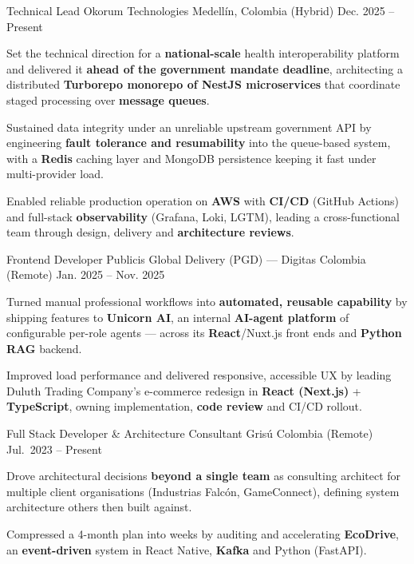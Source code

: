 \newcommand{\quotes}[1]{``#1''}

\begin{cventries}

  \cventry
  {Technical Lead}
  {Okorum Technologies}
  {Medellín, Colombia (Hybrid)}
  {Dec. 2025 -- Present}
  {
    \begin{cvitems}
      \item {Set the technical direction for a \textbf{national-scale} health interoperability platform and delivered it \textbf{ahead of the government mandate deadline}, architecting a distributed \textbf{Turborepo monorepo of NestJS microservices} that coordinate staged processing over \textbf{message queues}.}
      \item {Sustained data integrity under an unreliable upstream government API by engineering \textbf{fault tolerance and resumability} into the queue-based system, with a \textbf{Redis} caching layer and MongoDB persistence keeping it fast under multi-provider load.}
      \item {Enabled reliable production operation on \textbf{AWS} with \textbf{CI/CD} (GitHub Actions) and full-stack \textbf{observability} (Grafana, Loki, LGTM), leading a cross-functional team through design, delivery and \textbf{architecture reviews}.}
    \end{cvitems}
  }

  \cventry
  {Frontend Developer}
  {Publicis Global Delivery (PGD) — Digitas}
  {Colombia (Remote)}
  {Jan. 2025 -- Nov. 2025}
  {
    \begin{cvitems}
      \item {Turned manual professional workflows into \textbf{automated, reusable capability} by shipping features to \textbf{Unicorn AI}, an internal \textbf{AI-agent platform} of configurable per-role agents --- across its \textbf{React}/Nuxt.js front ends and \textbf{Python RAG} backend.}
      \item {Improved load performance and delivered responsive, accessible UX by leading Duluth Trading Company's e-commerce redesign in \textbf{React (Next.js)} + \textbf{TypeScript}, owning implementation, \textbf{code review} and CI/CD rollout.}
    \end{cvitems}
  }

  \cventry
  {Full Stack Developer \& Architecture Consultant}
  {Grisú}
  {Colombia (Remote)}
  {Jul.\ 2023 -- Present}
  {
    \begin{cvitems}
      \item {Drove architectural decisions \textbf{beyond a single team} as consulting architect for multiple client organisations (Industrias Falcón, GameConnect), defining system architecture others then built against.}
      \item {Compressed a 4-month plan into weeks by auditing and accelerating \textbf{EcoDrive}, an \textbf{event-driven} system in React Native, \textbf{Kafka} and Python (FastAPI).}
    \end{cvitems}
  }


\end{cventries}
